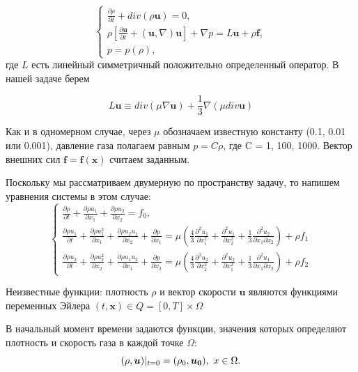 \documentclass[specialist,subf,href,colorlinks=true,12pt
,times,mtpro,specialist
]{disser}
\begin{document}
\begin{equation}
 \begin{cases}
   \frac{\partial \rho}{\partial t} + div(\rho \boldsymbol{u}) = 0,
   \\
   \rho [\frac{\partial \boldsymbol{u}}{\partial t} + (\boldsymbol{u}, \nabla)\boldsymbol{u}] +\nabla p = L\boldsymbol{u} + \rho \boldsymbol{f},
   \\
   p = p(\rho),
 \end{cases}
\end{equation} 
где $L$ есть линейный симметричный положительно определенный оператор. В нашей задаче берем 

$$ 
L\boldsymbol{u} \equiv div(\mu \nabla \boldsymbol{u}) + \frac{1}{3} \nabla(\mu div\boldsymbol{u})
$$

Как и в одномерном случае, через $\mu$ обозначаем известную константу (0.1, 0.01 или 0.001), давление газа полагаем равным $p = C\rho$, где C = 1, 100, 1000. Вектор внешних сил $\boldsymbol{f} = \boldsymbol{f} (\boldsymbol{x})$ считаем заданным.

Поскольку мы рассматриваем двумерную по пространству задачу, то напишем уравнения системы в этом случае:
\begin{equation}
 \begin{cases}
   \frac{\partial \rho}{\partial t} + \frac{\partial \rho u_1}{\partial x_1} + \frac{\partial \rho u_2}{\partial x_2} = f_0,
   \\
   \frac{\partial \rho u_1}{\partial t} + \frac{\partial \rho u_1^2}{\partial x_1} + \frac{\partial \rho u_2 u_1}{\partial x_2} + \frac{\partial p}{\partial x_1} = \mu (\frac{4}{3}\frac{\partial^2 u_1}{\partial x_1^2} + \frac{\partial^2 u_1}{\partial x_2^2} + \frac{1}{3}\frac{\partial^2 u_2}{\partial x_1 \partial x_2}) + \rho f_1
   \\
   \frac{\partial \rho u_2}{\partial t} + \frac{\partial \rho u_2^2}{\partial x_2} + \frac{\partial \rho u_1 u_2}{\partial x_1} + \frac{\partial p}{\partial x_2} = \mu (\frac{4}{3}\frac{\partial^2 u_2}{\partial x_2^2} + \frac{\partial^2 u_2}{\partial x_1^2} + \frac{1}{3}\frac{\partial^2 u_1}{\partial x_1 \partial x_2}) + \rho f_2
 \end{cases}
\end{equation} 

Неизвестные функции: плотность $\rho$ и вектор скорости $\boldsymbol{u}$ являются функциями переменных Эйлера $(t, \boldsymbol{x}) \in Q = [0, T] \times \Omega $

В начальный момент времени задаются функции, значения которых определяют плотность и скорость газа в каждой точке $\Omega$:
$$
(\rho, \boldsymbol{u})|_{t=0} = (\rho_0, \boldsymbol{u_0}),\ x \in \Omega. \\
$$
\end{document}
